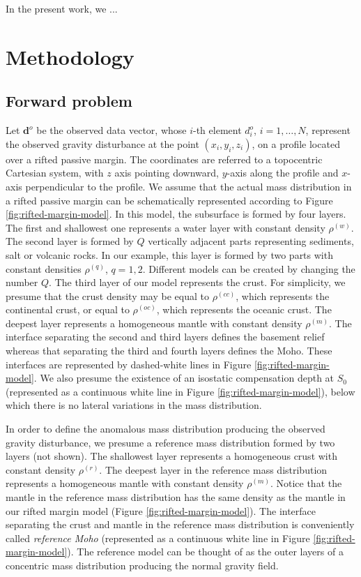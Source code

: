 \documentclass[manuscript]{geophysics}
\begin{document}
In the present work, we ...




\section{Methodology}


\subsection{Forward problem}


Let $\mathbf{d}^{o}$ be the observed data vector, whose $i$-th element $d^{o}_{i}$, 
$i = 1, \dots, N$, represent the observed gravity disturbance at the point 
$(x_{i}, y_{i}, z_{i})$, on a profile located over a rifted passive margin. The
coordinates are referred to a topocentric Cartesian system, with $z$ axis pointing
downward, $y$-axis along the profile and $x$-axis perpendicular to the profile. 
We assume that the actual mass distribution in a rifted passive margin can be 
schematically represented according to Figure \ref{fig:rifted-margin-model}. 
In this model, the subsurface is formed by four layers. 
The first and shallowest one represents a water layer with constant density
$\rho^{(w)}$. 
The second layer is formed by $Q$ vertically adjacent parts representing sediments,
salt or volcanic rocks.
In our example, this layer is formed by two parts with constant densities
$\rho^{(q)}$, $q = 1, 2$. Different models can be created by changing the number $Q$.
The third layer of our model represents the crust. For simplicity, we presume that the
crust density may be equal to $\rho^{(cc)}$, which
represents the continental crust, or equal to $\rho^{(oc)}$, which represents the
oceanic crust.
The deepest layer represents a homogeneous mantle with constant density $\rho^{(m)}$. 
The interface separating the second and third layers defines the basement relief whereas
that separating the third and fourth layers defines the Moho. These interfaces are
represented by dashed-white lines in Figure \ref{fig:rifted-margin-model}.
We also presume the existence of an isostatic compensation depth at $S_{0}$ 
(represented as a continuous white line in Figure \ref{fig:rifted-margin-model}),
below which there is no lateral variations in the mass distribution.

In order to define the anomalous mass distribution producing the observed gravity
disturbance, we presume a reference mass distribution formed by two 
layers (not shown). The shallowest layer represents a homogeneous crust with constant
density $\rho^{(r)}$.
The deepest layer in the reference mass distribution represents a homogeneous mantle
with constant density $\rho^{(m)}$. Notice that the mantle in the reference mass 
distribution has the same density as the mantle in our rifted margin model
(Figure \ref{fig:rifted-margin-model}).
The interface separating the crust and mantle in the reference mass distribution 
is conveniently called \textit{reference Moho} (represented as a continuous white line
in Figure \ref{fig:rifted-margin-model}).
The reference model can be thought of as the outer layers of a concentric
mass distribution producing the normal gravity field.
\end{document}
